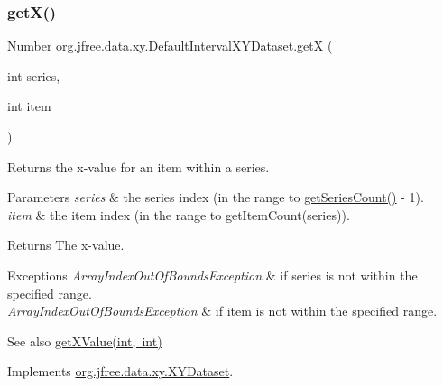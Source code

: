 \subsubsection{\texorpdfstring{get\+X()}{getX()}}
{\footnotesize\ttfamily Number org.\+jfree.\+data.\+xy.\+Default\+Interval\+X\+Y\+Dataset.\+getX (\begin{DoxyParamCaption}\item[{int}]{series,  }\item[{int}]{item }\end{DoxyParamCaption})}

Returns the x-\/value for an item within a series.


\begin{DoxyParams}{Parameters}
{\em series} & the series index (in the range {} to {\ttfamily \mbox{\hyperlink{classorg_1_1jfree_1_1data_1_1xy_1_1_default_interval_x_y_dataset_a11470bfa9b540c971123d4282c0f5a8a}{get\+Series\+Count()}} -\/ 1}). \\
\hline
{\em item} & the item index (in the range {} to {\ttfamily get\+Item\+Count(series)}).\\
\hline
\end{DoxyParams}
\begin{DoxyReturn}{Returns}
The x-\/value.
\end{DoxyReturn}

\begin{DoxyExceptions}{Exceptions}
{\em Array\+Index\+Out\+Of\+Bounds\+Exception} & if {\ttfamily series} is not within the specified range. \\
\hline
{\em Array\+Index\+Out\+Of\+Bounds\+Exception} & if {\ttfamily item} is not within the specified range.\\
\hline
\end{DoxyExceptions}
\begin{DoxySeeAlso}{See also}
\mbox{\hyperlink{classorg_1_1jfree_1_1data_1_1xy_1_1_default_interval_x_y_dataset_aecdfbb6de5b66cf970a8849b4a88efe9}{get\+X\+Value(int, int)}} 
\end{DoxySeeAlso}


Implements \mbox{\hyperlink{interfaceorg_1_1jfree_1_1data_1_1xy_1_1_x_y_dataset_a85c75ba5b69b551e96afd29d1732ba22}{org.\+jfree.\+data.\+xy.\+X\+Y\+Dataset}}.

\mbox{\label{classorg_1_1jfree_1_1data_1_1xy_1_1_default_interval_x_y_dataset_aecdfbb6de5b66cf970a8849b4a88efe9}} 
